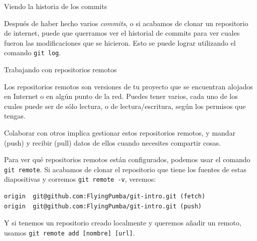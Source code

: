 \documentclass{beamer}
\begin{document}
\begin{frame}{Viendo la historia de los commits}

    Después de haber hecho varios \textit{commits}, o si acabamos de clonar un repositorio
    de internet, puede que querramos ver el historial de commits para ver cuales
    fueron las modificaciones que se hicieron. Esto se puede lograr utilizando el
    comando \texttt{git log}.

\end{frame}

\begin{frame}[fragile]{Trabajando con repositorios remotos}

    Los repositorios remotos son versiones de tu proyecto que se encuentran alojados
    en Internet o en algún punto de la red. Puedes tener varios, cada uno de los cuales
    puede ser de sólo lectura, o de lectura/escritura, según los permisos que tengas.

    \vspace{0.5em}

    Colaborar con otros implica gestionar estos repositorios remotos, y mandar (push) y recibir (pull)
    datos de ellos cuando necesites compartir cosas.

    \vspace{0.5em}

    Para ver qué repositorios remotos están configurados, podemos usar el comando \texttt{git remote}.
    Si acabamos de clonar el repositorio que tiene los fuentes de estas diapositivas y corremos \texttt{git remote -v}, veremos:
    \begin{verbatim}
origin  git@github.com:FlyingPumba/git-intro.git (fetch)
origin  git@github.com:FlyingPumba/git-intro.git (push)
    \end{verbatim}

    Y si tenemos un repositorio creado localmente y queremos añadir un remoto, usamos \texttt{git remote add [nombre] [url]}.

\end{frame}
\end{document}
